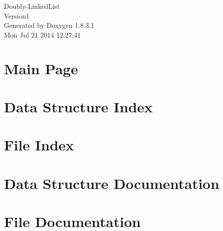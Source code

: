 \documentclass{book}
\begin{document}
\hypersetup{pageanchor=false,citecolor=blue}
\begin{titlepage}
\vspace*{7cm}
\begin{center}
{\Large Doubly-\/\-Linked\-List \\[1ex]\large Version1 }\\
\vspace*{1cm}
{\large Generated by Doxygen 1.8.3.1}\\
\vspace*{0.5cm}
{\small Mon Jul 21 2014 12:27:41}\\
\end{center}
\end{titlepage}
\clearemptydoublepage
{}
\tableofcontents
\clearemptydoublepage
{}
\hypersetup{pageanchor=true,citecolor=blue}
\chapter{Main Page}
\label{index}\hypertarget{index}{}
\chapter{Data Structure Index}

\chapter{File Index}

\chapter{Data Structure Documentation}



\chapter{File Documentation}


















\printindex
\end{document}
